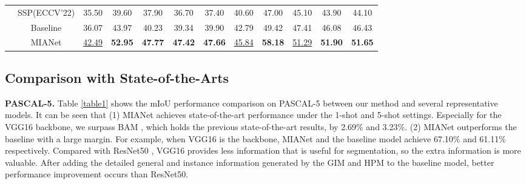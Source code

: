 \documentclass[10pt,twocolumn,letterpaper]{article}
\begin{document}
\begin{table*}[htbp]
\begin{tabular}{c|c|ccccc|ccccc}
		& \multicolumn{1}{c|}{SSP(ECCV'22)\cite{ssp}}                         & 35.50                                  & 39.60                                  & 37.90                         & 36.70                                  & \multicolumn{1}{c|}{37.40}                                  & 40.60                         & 47.00                                  & 45.10              & 43.90                                  & 44.10 \\  
		& Baseline                     & 36.07                                  & 43.97                                  & 40.23                                  & 39.34                                  & 39.90                                  & 42.79                         & 49.42                                  & 47.41                                  & 46.08                                  & 46.43                          \\
		& \cellcolor[HTML]{EFEFEF}MIANet & \cellcolor[HTML]{EFEFEF}\underline{42.49}          & \cellcolor[HTML]{EFEFEF}\textbf{52.95} & \cellcolor[HTML]{EFEFEF}\textbf{47.77} & \cellcolor[HTML]{EFEFEF}\textbf{47.42} & \cellcolor[HTML]{EFEFEF}\textbf{47.66} & \cellcolor[HTML]{EFEFEF}\underline{45.84} & \cellcolor[HTML]{EFEFEF}\textbf{58.18} & \cellcolor[HTML]{EFEFEF}\underline{51.29}          & \cellcolor[HTML]{EFEFEF}\textbf{51.90}          & \cellcolor[HTML]{EFEFEF}\textbf{51.65} \\ \hline
	\end{tabular}
	\label{table2}
\end{table*}


\subsection{Comparison with State-of-the-Arts}
\noindent\textbf{PASCAL-5.} Table \ref{table1} shows the mIoU performance comparison on PASCAL-5 between our method and several representative models. It can be seen that (1) MIANet achieves state-of-the-art performance under the 1-shot and 5-shot settings. Especially for the VGG16 \cite{vgg} backbone, we surpass BAM \cite{bam}, which holds the previous state-of-the-art results, by 2.69\% and 3.23\%. (2) MIANet outperforms the baseline with a large margin. For example, when VGG16 is the backbone, MIANet and the baseline model achieve 67.10\% and 61.11\% respectively. Compared with ResNet50 \cite{resnet}, VGG16 provides less information that is useful for segmentation, so the extra information is more valuable. After adding the detailed general and instance information generated by the GIM and HPM to the baseline model, better performance improvement occurs than ResNet50.\par
\end{document}
